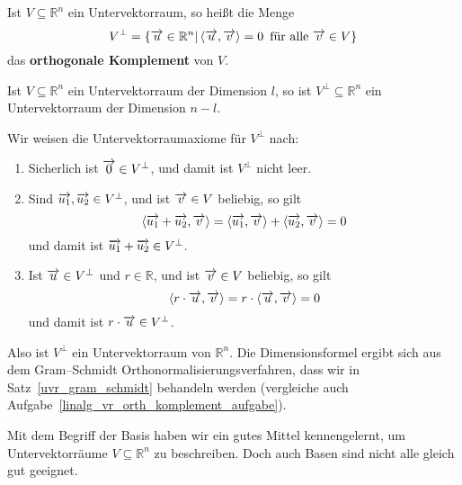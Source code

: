 \medbreak

\begin{definition}\label{linalg_vr_def_orth_komplement}
Ist $V \subseteq \mathbb R^n$ ein Untervektorraum, so heißt die Menge
  	$$ V^{\perp} = \{ \overrightarrow{u} \in \mathbb R^n \vert \, 
      \langle \overrightarrow{u}, \overrightarrow{v}  \rangle =  0 \, \textrm{ für alle } 
      \overrightarrow{v} \in V \} $$
das \textbf{orthogonale Komplement} von $V$.
\end{definition}

\begin{notiz}\label{linalg_vr_orth_komplement} Ist $V \subseteq \mathbb R^n$ ein Untervektorraum der 
Dimension $l$, so ist $V^{\perp} \subseteq \mathbb R^n$ ein Untervektorraum der Dimension $n-l$.
\end{notiz}

\beweis Wir weisen die Untervektorraumaxiome für $V^{\perp}$ nach:

\begin{enumerate}
\item Sicherlich ist $\overrightarrow{0} \in V^{\perp}$, und damit ist $V^{\perp}$ nicht leer.
\item Sind $\overrightarrow{u_1}, \overrightarrow{u_2} \in V^{\perp}$, und ist $\overrightarrow{v} \in V$ 
beliebig, so gilt
  	$$  \langle \overrightarrow{u_1} +  \overrightarrow{u_2}, \overrightarrow{v}  \rangle =  
    	\langle \overrightarrow{u_1}, \overrightarrow{v}  \rangle 
    	+  \langle \overrightarrow{u_2}, \overrightarrow{v}  \rangle = 0 $$
und damit ist $\overrightarrow{u_1} +  \overrightarrow{u_2} \in V^{\perp}$.
\item Ist $\overrightarrow{u} \in V^{\perp}$ und $r \in \mathbb R$, und ist $\overrightarrow{v} \in V$ 
beliebig, so gilt
  	$$  \langle r \cdot \overrightarrow{u}, \overrightarrow{v}  \rangle =  
     	r \cdot  \langle \overrightarrow{u}, \overrightarrow{v}  \rangle  = 0 $$
und damit ist $ r \cdot \overrightarrow{u} \in V^{\perp}$.
\end{enumerate}
Also ist $V^{\perp}$ ein Untervektorraum von $\mathbb R^n$. Die Dimensionsformel ergibt sich aus dem 
Gram--Schmidt Orthonormalisierungsverfahren, dass wir in Satz~\ref{uvr_gram_schmidt} behandeln werden 
(vergleiche auch Aufgabe~\ref{linalg_vr_orth_komplement_aufgabe}).
\bigbreak

\bigbreak

Mit dem Begriff der Basis haben wir ein gutes Mittel kennengelernt, um Untervektorräume $V \subseteq 
\mathbb R^n$ zu beschreiben. Doch auch Basen sind nicht alle gleich gut geeignet. 

